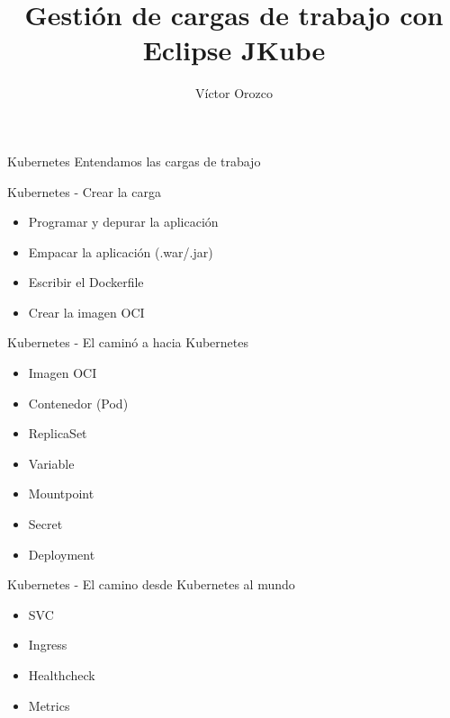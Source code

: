 \documentclass[aspectratio=169]{beamer}
\title{Gestión de cargas de trabajo con Eclipse JKube}
\author{Víctor Orozco}
\institute{GuateJUG}
\date{}
\begin{document}
{
    \frame{\titlepage}
}


\begin{frame}{Kubernetes}
\Large Entendamos las cargas de trabajo
\end{frame}

\begin{frame}{Kubernetes - Crear la carga}

\begin{itemize}
\item Programar y depurar la aplicación
\item Empacar la aplicación (.war/.jar)
\item Escribir el Dockerfile
\item Crear la imagen OCI
\end{itemize}

\end{frame}

\begin{frame}{Kubernetes - El caminó a hacia Kubernetes}
\begin{itemize}
\item Imagen OCI
\item Contenedor (Pod)
\item ReplicaSet
\item Variable
\item Mountpoint
\item Secret
\item Deployment
\end{itemize}
\end{frame}


\begin{frame}{Kubernetes - El camino desde Kubernetes al mundo}
\begin{itemize}
\item SVC
\item Ingress
\item Healthcheck
\item Metrics
\end{itemize}
\end{frame}
\end{document}
